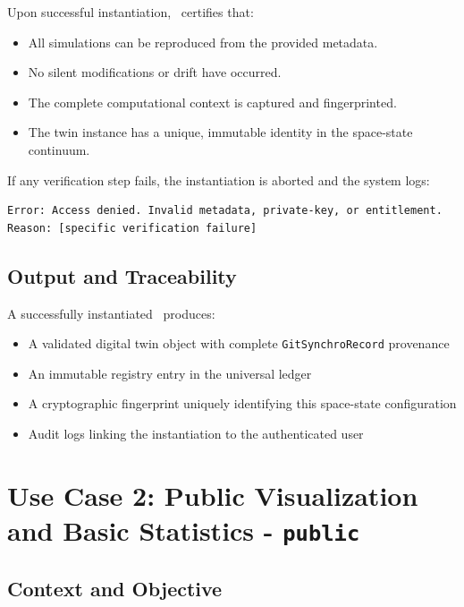 Upon successful instantiation, \hydrot\ certifies that:

\begin{itemize}
\item All simulations can be reproduced from the provided metadata.
\item No silent modifications or drift have occurred.
\item The complete computational context is captured and fingerprinted.
\item The twin instance has a unique, immutable identity in the space-state continuum.
\end{itemize}

If any verification step fails, the instantiation is aborted and the system logs:

\begin{verbatim}
Error: Access denied. Invalid metadata, private-key, or entitlement.
Reason: [specific verification failure]
\end{verbatim}

\subsection{Output and Traceability}

A successfully instantiated \hydrot\ produces:

\begin{itemize}
\item A validated digital twin object with complete \texttt{GitSynchroRecord} provenance
\item An immutable registry entry in the universal ledger
\item A cryptographic fingerprint uniquely identifying this space-state configuration
\item Audit logs linking the instantiation to the authenticated user
\end{itemize}


\section{Use Case 2: Public Visualization and Basic Statistics - \texttt{public}}

\subsection{Context and Objective}

